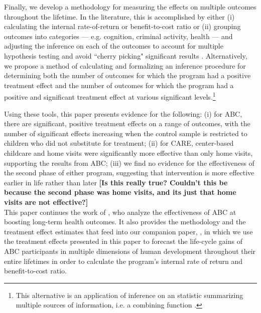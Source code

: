 Finally, we develop a methodology for measuring the effects on multiple outcomes throughout the lifetime. In the literature, this is accomplished by either (i) calculating the internal rate-of-return or benefit-to-cost ratio \citep{Heckman_Moon_etal_2010_RateofReturn}  or (ii) grouping outcomes into categories –-- e.g. cognition, criminal activity, health –-- and adjusting the inference on each of the outcomes to account for multiple hypothesis testing and avoid ``cherry picking" significant results \citep{Lehman_Romano_2005_AnnStat,Lehmann_Romano_2005_testing,Heckman_Moon_etal_2010_QE}. Alternatively, we propose a method of calculating and formalizing an inference procedure for determining both the number of outcomes for which the program had a positive treatment effect and the number of outcomes for which the program had  a positive and significant treatment effect at various significant levels.\footnote{This alternative is an application of inference on an statistic summarizing multiple sources of information, i.e. a combining function \citep{Pesarin_Salmaso_2010_PermutationTests}.}

Using these tools, this paper presents evidence for the following: (i) for ABC, there are significant, positive treatment effects on a range of outcomes, with the number of significant effects increasing when the control sample is restricted to children who did not substitute for treatment; (ii) for CARE, center-based childcare and home visits were significantly more effective than only home visits, supporting the results from ABC; (iii) we find no evidence for the effectiveness of the second phase of either program, suggesting that intervention is more effective earlier in life rather than later \textbf{[Is this really true? Couldn’t this be because the second phase was home visits, and its just that home visits are not effective?]} \\

\noindent This paper continues the work of \citet{Campbell_Conti_etal_2014_EarlyChildhoodInvestments}, who analyze the effectiveness of ABC at boosting long-term health outcomes. It also provides the methodology and the treatment effect estimates that feed into our companion paper, \citet{Elango_et_al_2015_ABC_unpublished}, in which we use the treatment effects presented in this paper to forecast the life-cycle gains of ABC participants in multiple dimensions of human development throughout their entire lifetimes in order to calculate the program's internal rate of return and benefit-to-cost ratio.\\


